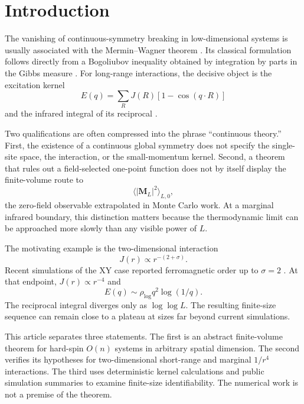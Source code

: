\documentclass[aps,prb,twocolumn,groupedaddress,amsmath,amssymb,
               superscriptaddress,nofootinbib,floatfix]{revtex4-2}
\theoremstyle{plain}
\theoremstyle{definition}
\newcommand{\rhoLog}{\rho_{\log}}
\begin{document}
\section{Introduction}

The vanishing of continuous-symmetry breaking in low-dimensional systems is
usually associated with the Mermin--Wagner theorem
\cite{MerminWagner1966}.  Its classical formulation follows directly from a
Bogoliubov inequality obtained by integration by parts in the Gibbs
measure \cite{Mermin1967}.  For long-range interactions, the decisive object
is the excitation kernel
\begin{equation}
 E(q)=\sum_RJ(R)[1-\cos(q\cdot R)]                      \label{eq:intro-kernel}
\end{equation}
and the infrared integral of its reciprocal
\cite{Bruno2001,Messager1984,Ioffe2002}.

Two qualifications are often compressed into the phrase ``continuous
theory.''  First, the existence of a continuous global symmetry does not
specify the single-site space, the interaction, or the small-momentum
kernel.  Second, a theorem that rules out a field-selected one-point
function does not by itself display the finite-volume route to
\begin{equation}
 \langle|\bm M_L|^2\rangle_{L,0},                       \label{eq:mc-M2}
\end{equation}
the zero-field observable extrapolated in Monte Carlo work.  At a marginal
infrared boundary, this distinction matters because the thermodynamic
limit can be approached more slowly than any visible power of $L$.

The motivating example is the two-dimensional interaction
\begin{equation}
 J(r)\propto r^{-(2+\sigma)}.                           \label{eq:power-law}
\end{equation}
Recent simulations of the XY case reported ferromagnetic order up to
$\sigma=2$ \cite{Xiao2025,Yao2025}.  At that endpoint,
$J(r)\propto r^{-4}$ and
\begin{equation}
 E(q)\sim\rhoLog q^2\log(1/q).                          \label{eq:intro-marginal}
\end{equation}
The reciprocal integral diverges only as $\log\log L$.  The resulting
finite-size sequence can remain close to a plateau at sizes far beyond
current simulations.

This article separates three statements.  The first is an abstract
finite-volume theorem for hard-spin $O(n)$ systems in arbitrary spatial
dimension.  The second verifies its hypotheses for two-dimensional
short-range and marginal $1/r^4$ interactions.  The third uses deterministic
kernel calculations and public simulation summaries to examine finite-size
identifiability.  The numerical work is not a premise of the theorem.
\end{document}
